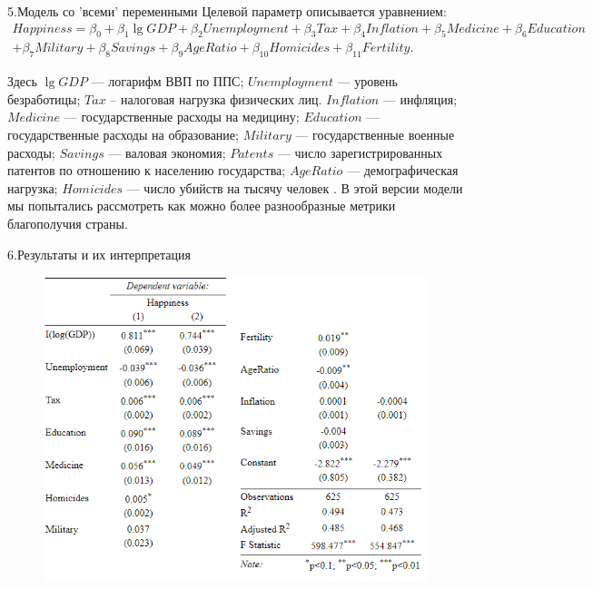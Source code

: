 \documentclass[aspectratio=169]{beamer}
\begin{document}
\begin{frame}{5.Модель со ’всеми’ переменными}
   Целевой параметр описывается уравнением:
   \footnotesize
        \begin{align*}
        Happiness = \beta_0 + \beta_1 \lg{GDP} + \beta_2 Unemployment + \beta_3 Tax + \beta_4 Inflation + \beta_5 Medicine + \beta_6 Education \\
            + \beta_7 Military + \beta_8 Savings + \beta_{9} AgeRatio + \beta_{10} Homicides + \beta_{11} Fertility.
        \end{align*}
    \normalsize

    Здесь $\lg{GDP}$ --- логарифм ВВП по ППС; $Unemployment$ --- уровень безработицы; $Tax$ -- налоговая нагрузка физических лиц. $Inflation$ --- инфляция; $Medicine$ --- государственные расходы на медицину; $Education$ --- государственные расходы на образование; $Military$ --- государственные военные расходы; $Savings$ --- валовая экономия; $Patents$ --- число зарегистрированных патентов по отношению к населению государства; $AgeRatio$ --- демографическая нагрузка; $Homicides$ --- число убийств на тысячу человек .
\hfill \break
\hfill \break
    В этой версии модели мы попытались рассмотреть как можно более разнообразные метрики благополучия страны.

\end{frame}

\begin{frame}{6.Результаты и их интерпретация}
   \begin{figure} \label{hompic}
            \centering
            \includegraphics[scale=0.75]{UnionTable.png}
    \end{figure}

\end{frame}
\end{document}
